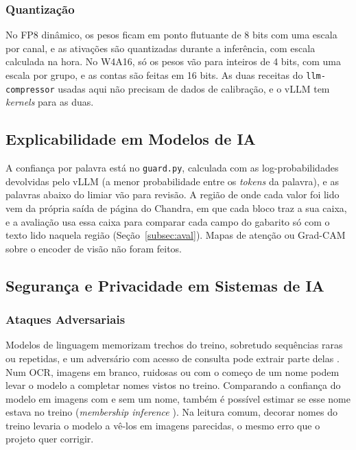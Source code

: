 \subsubsection{Quantização}
No FP8 dinâmico, os pesos ficam em ponto flutuante de 8 bits com uma escala por canal, e as ativações são quantizadas durante a inferência, com escala calculada na hora. No W4A16, só os pesos vão para inteiros de 4 bits, com uma escala por grupo, e as contas são feitas em 16 bits. As duas receitas do \texttt{llm-compressor} \cite{llmcompressor} usadas aqui não precisam de dados de calibração, e o vLLM \cite{vllm2023} tem \emph{kernels} para as duas.

\subsection{Explicabilidade em Modelos de IA}

A confiança por palavra está no \texttt{guard.py}, calculada com as log-probabilidades devolvidas pelo vLLM (a menor probabilidade entre os \emph{tokens} da palavra), e as palavras abaixo do limiar vão para revisão. A região de onde cada valor foi lido vem da própria saída de página do Chandra, em que cada bloco traz a sua caixa, e a avaliação usa essa caixa para comparar cada campo do gabarito só com o texto lido naquela região (Seção~\ref{subsec:aval}). Mapas de atenção ou Grad-CAM \cite{gradcam2017} sobre o encoder de visão não foram feitos.

\subsection{Segurança e Privacidade em Sistemas de IA}

\subsubsection{Ataques Adversariais}
Modelos de linguagem memorizam trechos do treino, sobretudo sequências raras ou repetidas, e um adversário com acesso de consulta pode extrair parte delas \cite{carlini2021extracting}. Num OCR, imagens em branco, ruidosas ou com o começo de um nome podem levar o modelo a completar nomes vistos no treino. Comparando a confiança do modelo em imagens com e sem um nome, também é possível estimar se esse nome estava no treino (\emph{membership inference} \cite{shokri2017membership}). Na leitura comum, decorar nomes do treino levaria o modelo a vê-los em imagens parecidas, o mesmo erro que o projeto quer corrigir.

